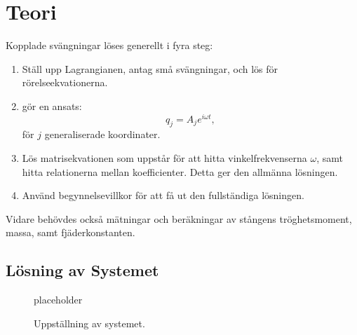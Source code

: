 \section{Teori}

Kopplade svängningar löses generellt i fyra steg:
\begin{enumerate}
    \item Ställ upp Lagrangianen, antag små svängningar, och lös för rörelseekvationerna.
    \item gör en ansats: \begin{equation}
        q_j = A_j e^{i\omega t},
    \end{equation}
    för $j$ generaliserade koordinater.
    
    \item Lös matrisekvationen som uppstår för att hitta vinkelfrekvenserna $\omega$, samt hitta relationerna mellan koefficienter. Detta ger den allmänna lösningen.
    \item Använd begynnelsevillkor för att få ut den fullständiga lösningen.
\end{enumerate}
Vidare behövdes också mätningar och beräkningar av stångens tröghetsmoment, massa, samt fjäderkonstanten.

\subsection{Lösning av Systemet}

\begin{figure}[htbp]
    \centering
    placeholder
    \caption{Uppställning av systemet.}
    \label{fig:uppställning}
\end{figure}

